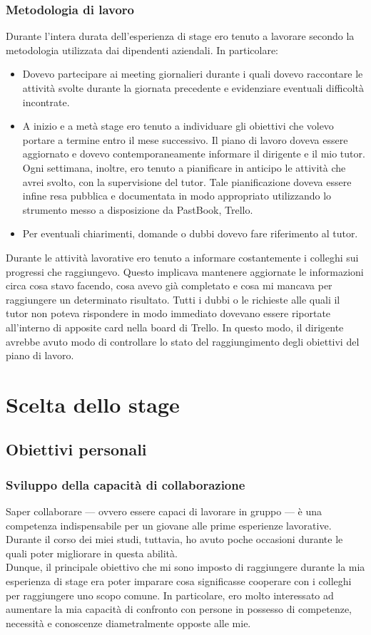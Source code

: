 		\subsubsection{Metodologia di lavoro}
			Durante l'intera durata dell'esperienza di stage ero tenuto a lavorare secondo la metodologia utilizzata dai dipendenti
			aziendali. In particolare:
			\begin{itemize}
				\item Dovevo partecipare ai meeting giornalieri durante i quali dovevo raccontare le attività svolte durante la
				giornata precedente e evidenziare eventuali difficoltà incontrate.
				\item A inizio e a metà stage ero tenuto a individuare gli obiettivi che volevo portare a termine entro il
				mese successivo. Il piano di lavoro doveva essere aggiornato e dovevo contemporaneamente informare il dirigente e il
				mio tutor. Ogni settimana, inoltre, ero tenuto a pianificare in anticipo le attività che avrei svolto, con la
				supervisione del tutor. Tale pianificazione doveva essere infine resa pubblica e documentata in modo appropriato
				utilizzando lo strumento messo a disposizione da PastBook, Trello.
				\item Per eventuali chiarimenti, domande o dubbi dovevo fare riferimento al tutor.
			\end{itemize}
			Durante le attività lavorative ero tenuto a informare costantemente i colleghi sui progressi che raggiungevo. Questo
			implicava mantenere aggiornate le informazioni circa cosa stavo facendo, cosa avevo già completato e cosa mi mancava
			per raggiungere un determinato risultato. Tutti i dubbi o le richieste alle quali il tutor non poteva rispondere in modo
			immediato dovevano essere riportate all'interno di apposite card nella board di Trello. In questo modo, il dirigente avrebbe
			avuto modo di controllare lo stato del raggiungimento degli obiettivi del piano di lavoro.
	\section{Scelta dello stage}
		\subsection{Obiettivi personali}
			\subsubsection{Sviluppo della capacità di collaborazione}
				Saper collaborare — ovvero essere capaci di lavorare in gruppo — è una competenza indispensabile per un giovane alle
				prime esperienze lavorative. Durante il corso dei miei studi, tuttavia, ho avuto poche occasioni durante le quali
				poter migliorare in questa abilità.\\
				Dunque, il principale obiettivo che mi sono imposto di raggiungere durante la mia esperienza di stage era
				poter imparare cosa significasse cooperare con i colleghi per raggiungere uno scopo comune. In particolare, ero molto
				interessato ad aumentare la mia capacità di confronto con persone in possesso di competenze, necessità e conoscenze
				diametralmente opposte alle mie.
